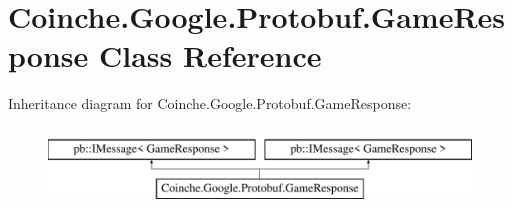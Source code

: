 \hypertarget{class_coinche_1_1_google_1_1_protobuf_1_1_game_response}{}\section{Coinche.\+Google.\+Protobuf.\+Game\+Response Class Reference}
\label{class_coinche_1_1_google_1_1_protobuf_1_1_game_response}
Inheritance diagram for Coinche.\+Google.\+Protobuf.\+Game\+Response\+:\begin{figure}[H]
\begin{center}
\leavevmode
\includegraphics[height=2.000000cm]{class_coinche_1_1_google_1_1_protobuf_1_1_game_response}
\end{center}
\end{figure}
